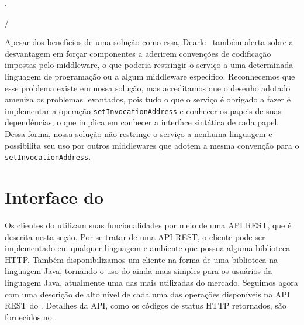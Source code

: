 .

/

Apesar dos benefícios de uma solução como essa, Dearle~\cite{Dearle2007PastPresentFuture} também alerta sobre a desvantagem em forçar componentes a aderirem convenções de codificação impostas pelo middleware, o que poderia restringir o serviço a uma determinada linguagem de programação ou a algum middleware específico. Reconhecemos que esse problema existe em nossa solução, mas acreditamos que o desenho adotado ameniza os problemas levantados, pois tudo o que o serviço é obrigado a fazer é implementar a operação \texttt{setInvocationAddress} e conhecer os papeis de suas dependências, o que implica em conhecer a interface sintática de cada papel. Dessa forma, nossa solução não restringe o serviço a nenhuma linguagem e possibilita seu uso por outros middlewares que adotem a mesma convenção para o \texttt{setInvocationAddress}.

\section{Interface do \ee}
\label{sec:interface}

Os clientes do \ee utilizam suas funcionalidades por meio de uma API REST, que é descrita nesta seção. 
Por se tratar de uma API REST, o cliente pode ser implementado em qualquer linguagem 
e ambiente que possua alguma biblioteca HTTP. 
Também disponibilizamos um cliente na forma de uma biblioteca na linguagem Java, 
tornando o uso do \ee ainda mais simples para os usuários da linguagem Java, 
atualmente uma das mais utilizadas do mercado. 
Seguimos agora com uma descrição de alto nível de cada uma das operações disponíveis 
na API REST do \ee. Detalhes da API, como os códigos de status HTTP retornados, 
são fornecidos no \userguide.


